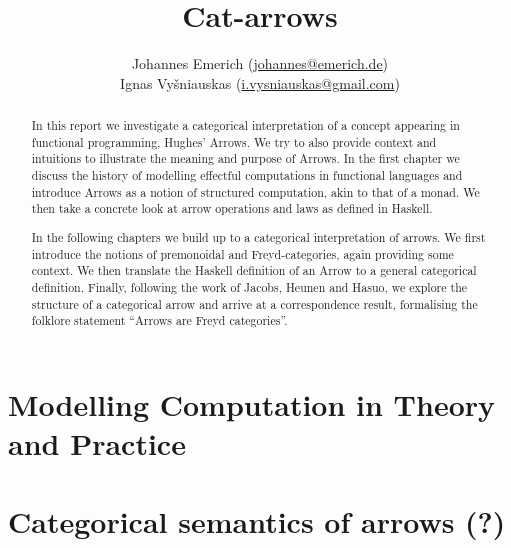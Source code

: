 \documentclass[12pt,a4paper,titlepage]{scrreprt}
\title{Cat-arrows}
\author{%
    Johannes Emerich
        (\href{mailto:johannes@emerich.de}{johannes@emerich.de})\\
    Ignas Vyšniauskas
        (\href{mailto:i.vysniauskas@gmail.com}{i.vysniauskas@gmail.com})
}
\date{}
\theoremstyle{definition}
\theoremstyle{plain}
\begin{document}
\maketitle

\begin{abstract}
    In this report we investigate a categorical interpretation of a concept
    appearing in functional programming, Hughes' Arrows. We try to also provide
    context and intuitions to illustrate the meaning and purpose of Arrows.  In
    the first chapter we discuss the history of modelling effectful computations
    in functional languages and introduce Arrows as a notion of structured
    computation, akin to that of a monad. We then take a concrete look at arrow
    operations and laws as defined in Haskell.

    In the following chapters we build up to a categorical interpretation of
    arrows. We first introduce the notions of premonoidal and Freyd-categories,
    again providing some context. We then translate the Haskell definition of an
    Arrow to a general categorical definition. Finally, following the work of
    Jacobs, Heunen and Hasuo, we explore the structure of a categorical arrow
    and arrive at a correspondence result, formalising the folklore statement
    ``Arrows are Freyd categories''.
\end{abstract}


\chapter{Modelling Computation in Theory and Practice}
    
    
\chapter{Categorical semantics of arrows (?)}
    
    
    

\nocite{mustard}
\printbibliography
\end{document}
